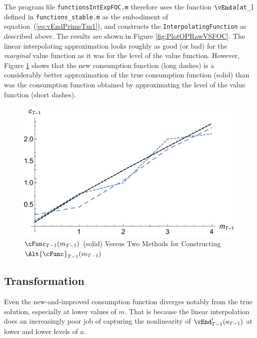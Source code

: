 \documentclass[titlepage]{\econtex}
\begin{document}
The program file \texttt{functionsIntExpFOC.m} therefore
uses the function \texttt{$\vEnd$a[at\_]} defined in \texttt{functions\_stable.m}
as the embodiment of equation~(\ref{eq:vEndPrimeTm1}), and constructs the
\texttt{InterpolatingFunction} as described above.  The results are
shown in Figure \ref{fig:PlotOPRawVSFOC}.  The linear
interpolating approximation looks roughly as good (or bad) for the
\textit{marginal} value function as it was for the level of the value
function. However, Figure \ref{fig:PlotcTm1ABC} shows that the new
consumption function (long dashes) is a considerably better
approximation of the true consumption function (solid) than was the
consumption function obtained by approximating the level of the
value function (short dashes).

\hypertarget{PlotcTm1ABC}{}
\begin{figure}
  \includegraphics{./Figures/PlotcTm1ABC}
  \caption{$\cFunc_{T-1}({m}_{T-1})$ (solid) Versus Two Methods for Constructing $\Alt{\cFunc}_{T-1}({m}_{T-1})$}
  \label{fig:PlotcTm1ABC}
\end{figure}

\hypertarget{Transformation}{}
\subsection{Transformation}

Even the new-and-improved consumption function diverges notably from the true
solution, especially at lower values of ${m}$.  That is because the
linear interpolation does an increasingly poor job of capturing the
nonlinearity of $\vEnd_{T-1}^{\prime}({a}_{T-1})$ at
lower and lower levels of ${a}$.
\end{document}
